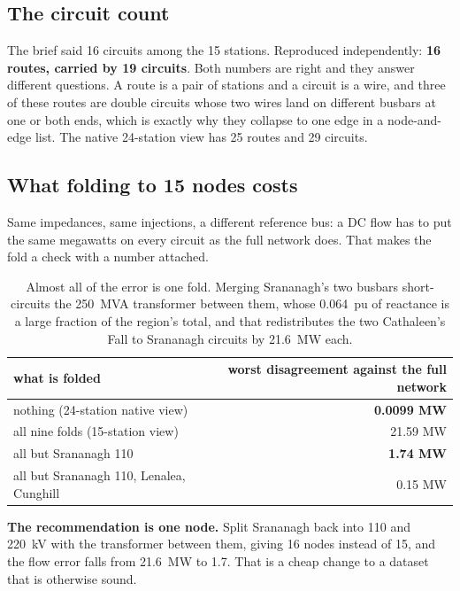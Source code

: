 \documentclass[11pt,a4paper]{article}
\begin{document}

\subsection{The circuit count}

The brief said 16 circuits among the 15 stations. Reproduced independently:
\textbf{16 routes, carried by 19 circuits}. Both numbers are right and they
answer different questions. A route is a pair of stations and a circuit is a
wire, and three of these routes are double circuits whose two wires land on
different busbars at one or both ends, which is exactly why they collapse to
one edge in a node-and-edge list. The native 24-station view has 25 routes and
29 circuits.

\subsection{What folding to 15 nodes costs}

Same impedances, same injections, a different reference bus: a DC flow has to
put the same megawatts on every circuit as the full network does. That makes
the fold a check with a number attached.

\begin{table}[H]\centering\small
\begin{tabular}{lr}
\toprule
\textbf{what is folded} & \textbf{worst disagreement against the full network} \\
\midrule
nothing (24-station native view)         & \textbf{0.0099 MW} \\
all nine folds (15-station view)         & 21.59 MW \\
all but Srananagh 110                    & \textbf{1.74 MW} \\
all but Srananagh 110, Lenalea, Cunghill & 0.15 MW \\
\bottomrule
\end{tabular}
\caption{Almost all of the error is one fold. Merging Srananagh's two busbars
short-circuits the 250~MVA transformer between them, whose 0.064~pu of
reactance is a large fraction of the region's total, and that redistributes the
two Cathaleen's Fall to Srananagh circuits by 21.6~MW each.}
\end{table}

\textbf{The recommendation is one node.} Split Srananagh back into 110 and
220~kV with the transformer between them, giving 16 nodes instead of 15, and
the flow error falls from 21.6~MW to 1.7. That is a cheap change to a dataset
that is otherwise sound.
\end{document}
